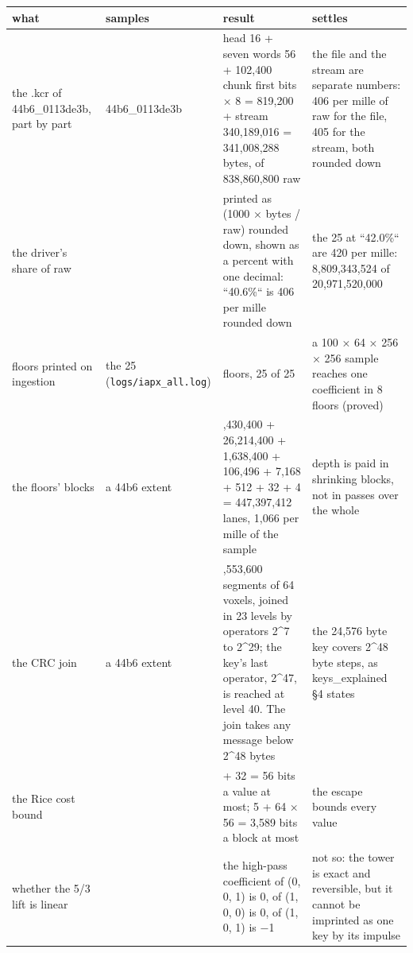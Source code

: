 {\footnotesize
\setlength{\tabcolsep}{6pt}
\begin{longtable}{>{\RaggedRight\arraybackslash}p{}>{\RaggedRight\arraybackslash}p{}>{\RaggedRight\arraybackslash}p{}>{\RaggedRight\arraybackslash}p{}}
\toprule
what & samples & result & settles \\
\midrule
\endhead
the .kcr of 44b6\_\allowbreak{}0113de3b, part by part & 44b6\_\allowbreak{}0113de3b & head 16 + seven words 56 + 102,400 chunk first bits × 8 = 819,200 + stream 340,189,016 = 341,008,288 bytes, of 838,860,800 raw & the file and the stream are separate numbers: 406 per mille of raw for the file, 405 for the stream, both rounded down \\
the driver's share of raw &  & printed as (1000 × bytes / raw) rounded down, shown as a percent with one decimal: “40.6\%“ is 406 per mille rounded down & the 25 at “42.0\%“ are 420 per mille: 8,809,343,524 of 20,971,520,000 \\
floors printed on ingestion & the 25 (\texttt{logs/\allowbreak{}iapx\_\allowbreak{}all.\allowbreak{}log}) & 8 floors, 25 of 25 & a 100 × 64 × 256 × 256 sample reaches one coefficient in 8 floors (proved) \\
the floors' blocks & a 44b6 extent & 419,430,400 + 26,214,400 + 1,638,400 + 106,496 + 7,168 + 512 + 32 + 4 = 447,397,412 lanes, 1,066 per mille of the sample & depth is paid in shrinking blocks, not in passes over the whole \\
the CRC join & a 44b6 extent & 6,553,600 segments of 64 voxels, joined in 23 levels by operators 2\textasciicircum{}7 to 2\textasciicircum{}29; the key's last operator, 2\textasciicircum{}47, is reached at level 40. The join takes any message below 2\textasciicircum{}48 bytes & the 24,576 byte key covers 2\textasciicircum{}48 byte steps, as keys\_\allowbreak{}explained §4 states \\
the Rice cost bound &  & 24 + 32 = 56 bits a value at most; 5 + 64 × 56 = 3,589 bits a block at most & the escape bounds every value \\
whether the 5/3 lift is linear &  & the high-pass coefficient of (0, 0, 1) is 0, of (1, 0, 0) is 0, of (1, 0, 1) is −1 & not so: the tower is exact and reversible, but it cannot be imprinted as one key by its impulse \\
\bottomrule
\end{longtable}
}


